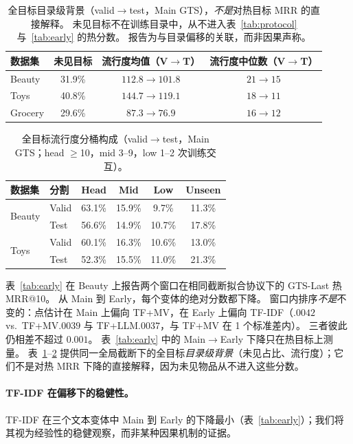 \documentclass[sigconf,natbib=true,anonymous]{acmart}
\newcommand{\tfidf}{\textsc{TF-IDF}\xspace}
\newcommand{\tfllm}{\textsc{TF+LLM}\xspace}
\newcommand{\tfmv}{\textsc{TF+MV}\xspace}
\begin{document}
\begin{table}[t]
\centering
\caption{%
全目标目录级背景（valid$\to$test，Main GTS），\emph{不是}对热目标 MRR 的直接解释。
未见目标不在训练目录中，从不进入表~\ref{tab:protocol} 与~\ref{tab:early} 的热分数。
报告为与目录偏移的关联，而非因果声称。%
}
\label{tab:shift}
\small
\setlength{\tabcolsep}{4pt}
\begin{tabular}{@{}lccc@{}}
\toprule
数据集 & 未见目标 & 流行度均值（V$\to$T） & 流行度中位数（V$\to$T） \\
\midrule
Beauty  & 31.9\% & $112.8 \to 101.8$ & $21 \to 15$ \\
Toys    & 40.8\% & $144.7 \to 119.1$ & $18 \to 11$ \\
Grocery & 29.6\% & $87.3 \to 76.9$ & $16 \to 12$ \\
\bottomrule
\end{tabular}
\end{table}

\begin{table}[t]
\centering
\caption{%
全目标流行度分桶构成（valid$\to$test，Main GTS；head $\ge$10，mid 3--9，low 1--2 次训练交互）。%
}
\label{tab:bucket}
\small
\setlength{\tabcolsep}{3.5pt}
\begin{tabular}{@{}llcccc@{}}
\toprule
数据集 & 分割 & Head & Mid & Low & Unseen \\
\midrule
\multirow{2}{*}{Beauty}
 & Valid & 63.1\% & 15.9\% & 9.7\% & 11.3\% \\
 & Test  & 56.6\% & 14.9\% & 10.7\% & 17.8\% \\
\midrule
\multirow{2}{*}{Toys}
 & Valid & 60.1\% & 16.3\% & 10.6\% & 13.0\% \\
 & Test  & 52.3\% & 15.5\% & 11.0\% & 21.3\% \\
\bottomrule
\end{tabular}
\end{table}

表~\ref{tab:early} 在 Beauty 上报告两个窗口在相同截断拟合协议下的 GTS-Last 热 MRR@10。
从 Main 到 Early，每个变体的绝对分数都下降。
窗口内排序\emph{不是}不变的：点估计在 Main 上偏向 \tfmv，在 Early 上偏向 \tfidf（$.0042$ vs.\ \tfmv $.0039$ 与 \tfllm $.0037$，与 \tfmv 在 1 个标准差内）。
三者彼此仍相差不超过 $0.001$。
表~\ref{tab:early} 中的 Main$\to$Early 下降只在热目标上测量。
表~\ref{tab:shift}--\ref{tab:bucket} 提供同一全局截断下的全目标\emph{目录级背景}（未见占比、流行度）；它们不是对热 MRR 下降的直接解释，因为未见物品从不进入这些分数。

\paragraph{TF-IDF 在偏移下的稳健性。}
\tfidf 在三个文本变体中 Main 到 Early 的下降最小（表~\ref{tab:early}）；我们将其视为经验性的稳健观察，而非某种因果机制的证据。
\end{document}
